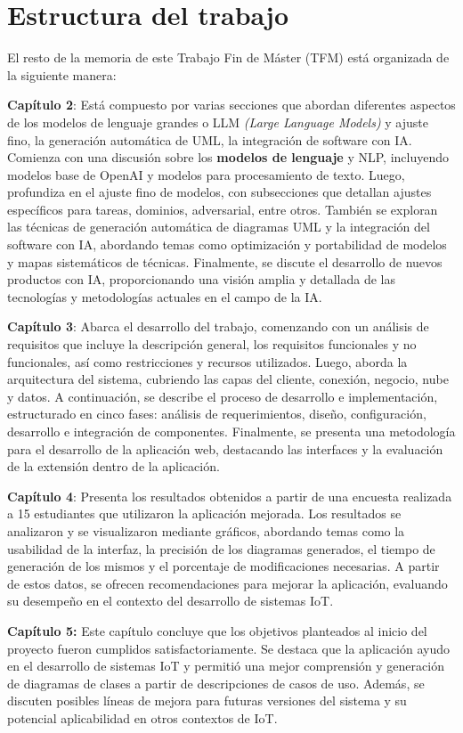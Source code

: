 \section{Estructura del trabajo}\label{section:estructura}

El resto de la memoria de este Trabajo Fin de Máster (TFM) está organizada de la siguiente manera:

\textbf{Capítulo 2}: Está compuesto por varias secciones que abordan diferentes aspectos de los modelos de lenguaje grandes o LLM \textit{(Large Language Models)} y ajuste fino, la generación automática de UML, la integración de software con IA. Comienza con una discusión sobre los \textbf{modelos de lenguaje} y NLP, incluyendo modelos base de OpenAI y modelos para procesamiento de texto. Luego, profundiza en el ajuste fino de modelos, con subsecciones que detallan ajustes específicos para tareas, dominios, adversarial, entre otros. También se exploran las técnicas de generación automática de diagramas UML y la integración del software con IA, abordando temas como optimización y portabilidad de modelos y mapas sistemáticos de técnicas. Finalmente, se discute el desarrollo de nuevos productos con IA, proporcionando una visión amplia y detallada de las tecnologías y metodologías actuales en el campo de la IA.

\textbf{Capítulo 3}:  Abarca el desarrollo del trabajo, comenzando con un análisis de requisitos que incluye la descripción general, los requisitos funcionales y no funcionales, así como restricciones y recursos utilizados. Luego, aborda la arquitectura del sistema, cubriendo las capas del cliente, conexión, negocio, nube y datos. A continuación, se describe el proceso de desarrollo e implementación, estructurado en cinco fases: análisis de requerimientos, diseño, configuración, desarrollo e integración de componentes. Finalmente, se presenta una metodología para el desarrollo de la aplicación web, destacando las interfaces y la evaluación de la extensión dentro de la aplicación.

\textbf{Capítulo 4}: Presenta los resultados obtenidos a partir de una encuesta realizada a 15 estudiantes que utilizaron la aplicación mejorada. Los resultados se analizaron y se visualizaron mediante gráficos, abordando temas como la usabilidad de la interfaz, la precisión de los diagramas generados, el tiempo de generación de los mismos y el porcentaje de modificaciones necesarias. A partir de estos datos, se ofrecen recomendaciones para mejorar la aplicación, evaluando su desempeño en el contexto del desarrollo de sistemas IoT.

\textbf{Capítulo 5:} Este capítulo concluye que los objetivos planteados al inicio del proyecto fueron cumplidos satisfactoriamente. Se destaca que la aplicación ayudo en el desarrollo de sistemas IoT y permitió una mejor comprensión y generación de diagramas de clases a partir de descripciones de casos de uso. Además, se discuten posibles líneas de mejora para futuras versiones del sistema y su potencial aplicabilidad en otros contextos de IoT.